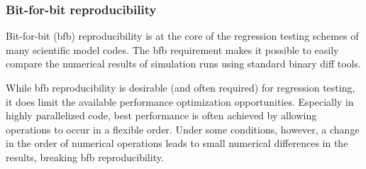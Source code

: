  
\setlength{\oldparskip}{\parskip}
\setlength{\parskip}{1.5ex}
\setlength{\oldparindent}{\parindent}
\setlength{\parindent}{0pt}
\setlength{\oldbaselineskip}{\baselineskip}
\setlength{\baselineskip}{11pt}
 
\def\bv{\begin{verbatim}}
\def\ev{\end{verbatim}}
\def\be{\begin{equation}}
\def\ee{\end{equation}}
\def\bea{\begin{eqnarray}}
\def\eea{\end{eqnarray}}
\def\bi{\begin{itemize}}
\def\ei{\end{itemize}}
\def\bn{\begin{enumerate}}
\def\en{\end{enumerate}}
\def\bd{\begin{description}}
\def\ed{\end{description}}
\def\({\left (}
\def\){\right )}
\def\[{\left [}
\def\]{\right ]}
\def\<{\left  \langle}
\def\>{\right \rangle}
\def\cI{{\cal I}}
\def\diag{\mathop{\rm diag}}
\def\tr{\mathop{\rm tr}}


 

   \subsubsection{Bit-for-bit reproducibility}
   \label{RH:bfb}
  
   Bit-for-bit (bfb) reproducibility is at the core of the regression testing
   schemes of many scientific model codes. The bfb requirement makes it possible
   to easily compare the numerical results of simulation runs using standard
   binary diff tools.
  
   While bfb reproducibility is desirable (and often required) for regression
   testing, it does limit the available performance optimization
   opportunities. Especially in highly parallelized code, best performance is 
   often achieved by allowing operations to occur in a flexible order. Under
   some conditions, however, a change in the order of numerical operations
   leads to small numerical differences in the results, breaking bfb
   reproducibility.
  
